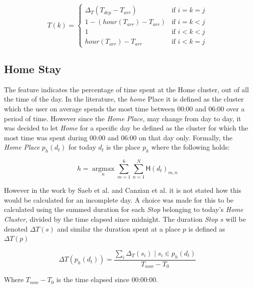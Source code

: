 \begin{equation}
\label{eq:feature-hour-computaion3}
T(k) =
\begin{cases}
    \Delta_T (T_{dep} - T_{arr})    & \text{if $i = k = j$} \\
    1 - (hour(T_{arr}) - T_{arr})   & \text{if $i = k < j$} \\
    1                               & \text{if $i < k < j$} \\
    hour(T_{arr}) - T_{arr}         & \text{if $i < k = j$}
\end{cases}
\end{equation}


\subsection{Home Stay}
The  feature indicates the percentage of time spent at the Home cluster, out of all the time of the day. In the literature, the \textit{home} Place it is defined as the cluster which the user on average spends the most time between 00:00 and 06:00 over a period of time. However since the \textit{Home Place,} may change from day to day, it was decided to let \textit{Home} for a specific day be defined as the cluster for which the most time was spent during 00:00 and 06:00 on that day only. Formally, the \textit{Home Place} $p_h (d_t)$ for today $d_t$ is the place $p_h$ where the following holds:

\begin{equation}
\label{eq:feature-home-place}
h = \operatorname*{argmax}_n \sum_{m=1}^{6} \sum_{n=1}^{N}  \mathsf{H}(d_t)_{m,n}
\end{equation}

However in the work by Saeb et al. \cite{Saeb2015} and Canzian et al.\cite{Canzian2015} it is not stated how this would be calculated for an incomplete day. A choice was made for this to be calculated using the summed duration for each \textit{Stop} belonging to today's \textit{Home Cluster}, divided by the time elapsed since midnight. The duration \textit{Stop} $s$ will be denoted $\Delta T (s)$ and similar the duration spent at a place $p$ is defined as $\Delta T (p)$

\begin{equation}
\label{eq:feature-home-place}
\Delta T(p_{h} (d_t) )= \frac{\sum_i \Delta_T (s_i) \;|\; s_i \in p_h (d_t)}{T_{now} - T_{0}}
\end{equation}

Where $T_{now} - T_0$ is the time elapsed since 00:00:00.


